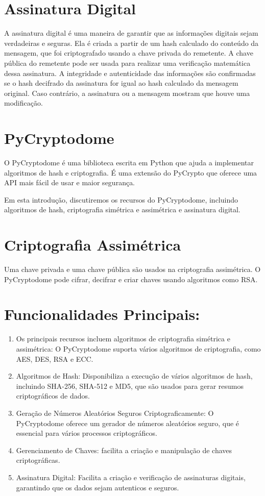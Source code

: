 \documentclass[a4paper,12pt]{article}
\begin{document}
\section{Assinatura Digital}
\hspace{0.5cm}A assinatura digital é uma maneira de garantir que as informações 
digitais sejam verdadeiras e seguras. Ela é criada a partir de um hash calculado 
do conteúdo da mensagem, que foi criptografado usando a chave privada do remetente. 
A chave pública do remetente pode ser usada para realizar uma verificação matemática 
dessa assinatura. A integridade e autenticidade das informações são confirmadas se o 
hash decifrado da assinatura for igual ao hash calculado da mensagem original. Caso 
contrário, a assinatura ou a mensagem mostram que houve uma modificação.

\section{PyCryptodome}
O PyCryptodome é uma biblioteca escrita em Python que ajuda a implementar algoritmos 
de hash e criptografia. É uma extensão do PyCrypto que oferece uma API mais fácil de 
usar e maior segurança.

Em esta introdução, discutiremos os recursos do PyCryptodome, incluindo algoritmos 
de hash, criptografia simétrica e assimétrica e assinatura digital.

\section{Criptografia Assimétrica}
Uma chave privada e uma chave pública são usados na criptografia assimétrica. O 
PyCryptodome pode cifrar, decifrar e criar chaves usando algoritmos como RSA.

\section{Funcionalidades Principais:}
\begin{enumerate}
\item Os principais recursos incluem algoritmos de criptografia simétrica e assimétrica: 
O PyCryptodome suporta vários algoritmos de criptografia, como AES, DES, RSA e ECC.

\item Algoritmos de Hash: Disponibiliza a execução de vários algoritmos de hash, incluindo 
SHA-256, SHA-512 e MD5, que são usados para gerar resumos criptográficos de dados.

\item Geração de Números Aleatórios Seguros Criptograficamente: O PyCryptodome oferece 
um gerador de números aleatórios seguro, que é essencial para vários processos criptográficos.

\item Gerenciamento de Chaves: facilita a criação e manipulação de chaves criptográficas.

\item Assinatura Digital: Facilita a criação e verificação de assinaturas digitais, 
garantindo que os dados sejam autenticos e seguros.

\end{enumerate}
\end{document}
